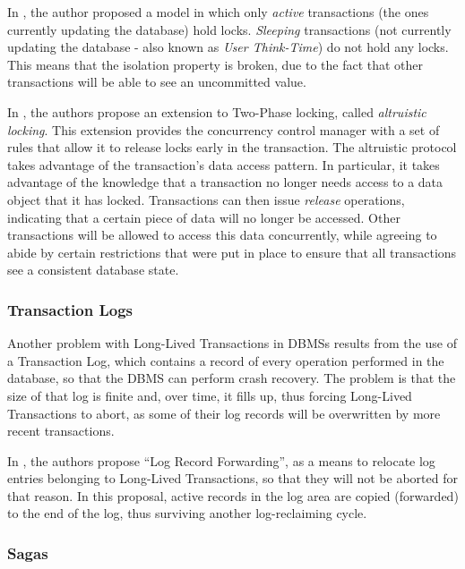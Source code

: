 \documentclass{llncs}
\begin{document}
In \cite{gray1981transaction}, the author proposed a model in which
only {\it active} transactions (the ones currently updating the
database) hold locks. {\it Sleeping} transactions (not currently
updating the database - also known as {\it User Think-Time}) do not
hold any locks. This means that the isolation property is broken, due
to the fact that other transactions will be able to see an uncommitted
value.

In \cite{salem1989altruistic}, the authors propose an extension to
Two-Phase locking, called {\it altruistic locking}. This extension
provides the concurrency control manager with a set of rules that
allow it to release locks early in the transaction. The altruistic
protocol takes advantage of the transaction's data access pattern. In
particular, it takes advantage of the knowledge that a transaction no
longer needs access to a data object that it has locked. Transactions
can then issue {\it release} operations, indicating that a certain
piece of data will no longer be accessed. Other transactions will be
allowed to access this data concurrently, while agreeing to abide by
certain restrictions that were put in place to ensure that all
transactions see a consistent database state.

\subsubsection{Transaction Logs}

Another problem with Long-Lived Transactions in DBMSs results from the
use of a Transaction Log, which contains a record of every operation
performed in the database, so that the DBMS can perform crash
recovery. The problem is that the size of that log is finite and, over
time, it fills up, thus forcing Long-Lived Transactions to abort, as
some of their log records will be overwritten by more recent
transactions.

In \cite{hagmann1991implementing}, the authors propose ``Log Record
Forwarding'', as a means to relocate log entries belonging to
Long-Lived Transactions, so that they will not be aborted for that
reason. In this proposal, active records in the log area are copied
(forwarded) to the end of the log, thus surviving another
log-reclaiming cycle.

\subsubsection{Sagas}
\label{sec:sagas}
\end{document}

